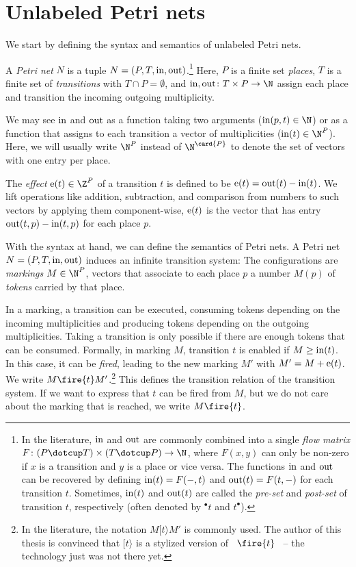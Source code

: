 \documentclass[../../diss.tex]{subfiles}
\begin{document}
\section{Unlabeled Petri nets}%
\label{Section:PNUnlabeled}%

We start by defining the syntax and semantics of unlabeled Petri nets.

    A \emph{Petri net} $N$ is a tuple $N = (P, T, \text{in}, \text{out})$.\footnote[1]{In the literature, $\text{in}$ and $\text{out}$ are commonly combined into a single \emph{flow matrix} $F \colon (P \dotcup T) \times (T \dotcup P) \to \N$, where $F(x,y)$ can only be non-zero if $x$ is a transition and $y$ is a place or vice versa.
        The functions $\text{in}$ and $\text{out}$ can be recovered by defining $\text{in}(t) = F(-,t)$ and $\text{out}(t) = F(t,-)$ for each transition $t$.
        Sometimes, $\text{in}(t)$ and $\text{out}(t)$ are called the \emph{pre-set} and \emph{post-set} of transition $t$, respectively (often denoted by ${}^\bullet t$ and $t^\bullet$).
    }
    Here, $P$ is a finite set \emph{places}, $T$ is a finite set of \emph{transitions} with $T \cap P = \emptyset$, and $\i, \o \colon T \times P \to \N$ assign each place and transition the incoming \resp outgoing multiplicity.

We may see $\text{in}$ and $\text{out}$ as a function taking two arguments (\eg $\i(p,t) \in \N$) or as a function that assigns to each transition a vector of multiplicities (\eg $\i(t) \in \N^P$).
Here, we will usually write $\N^P$ instead of $\N^{\card{P}}$ to denote the set of vectors with one entry per place.

The \emph{effect} $\e(t) \in \Z^P$ of a transition $t$ is defined to be $\text{e}(t) = \text{out}(t) - \text{in}(t)$.
We lift operations like addition, subtraction, and comparison from numbers to such vectors by applying them component-wise, \eg $\text{e}(t)$ is the vector that has entry $\text{out}(t,p) - \text{in}(t,p)$ for each place $p$.

With the syntax at hand, we can define the semantics of Petri nets.
A Petri net $N = (P,T,\text{in},\text{out})$ induces an infinite transition system:
The configurations are \emph{markings} $M \in \N^P$, vectors that associate to each place $p$ a number $M(p)$ of \emph{tokens} carried by that place.

In a marking, a transition can be executed, consuming tokens depending on the incoming multiplicities and producing tokens depending on the outgoing multiplicities.
Taking a transition is only possible if there are enough tokens that can be consumed.
Formally, in marking $M$, transition $t$ is enabled if $M \geq \text{in}(t)$.
In this case, it can be \emph{fired}, leading to the new marking $M'$ with $M' = M + \text{e}(t)$.
We write $M \fire{t} M'$.\footnote{In the literature, the notation $M [t\rangle M'$ is commonly used.
    The author of this thesis is convinced that $[t\rangle$ is a stylized version of \, $\fire{t}$ \, -- the technology just was not there yet.
}
This defines the transition relation of the transition system.
If we want to express that $t$ can be fired from $M$, but we do not care about the marking that is reached, we write $M \fire{t}$.
\end{document}
